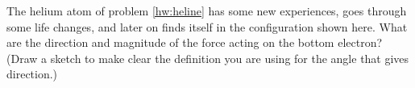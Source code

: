 The helium atom of problem \ref{hw:heline} has some new experiences,
        goes through some life changes, and later on finds itself in
        the configuration shown here.  What are the direction and
        magnitude of the force acting on the bottom electron?  (Draw
        a sketch to make clear the definition you are using for the
        angle that gives direction.)\answercheck
